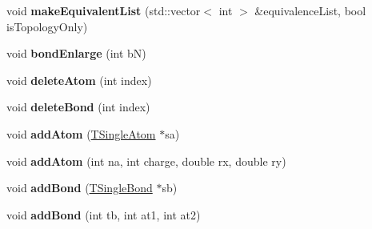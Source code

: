 \begin{DoxyCompactItemize}
\item 
\hypertarget{class_open_babel_1_1_t_simple_molecule_a13f944d57ee4340a444072091af5b9ff}{void {\bfseries make\-Equivalent\-List} (std\-::vector$<$ int $>$ \&equivalence\-List, bool is\-Topology\-Only)}\label{class_open_babel_1_1_t_simple_molecule_a13f944d57ee4340a444072091af5b9ff}

\item 
\hypertarget{class_open_babel_1_1_t_simple_molecule_ae52902f0fb246016dab39e98637a2519}{void {\bfseries bond\-Enlarge} (int b\-N)}\label{class_open_babel_1_1_t_simple_molecule_ae52902f0fb246016dab39e98637a2519}

\item 
\hypertarget{class_open_babel_1_1_t_simple_molecule_a1e20ed25ddd1f3f098cfca53c9f77b03}{void {\bfseries delete\-Atom} (int index)}\label{class_open_babel_1_1_t_simple_molecule_a1e20ed25ddd1f3f098cfca53c9f77b03}

\item 
\hypertarget{class_open_babel_1_1_t_simple_molecule_ad91e0e536a0095cc7a42fa2c6d3336cf}{void {\bfseries delete\-Bond} (int index)}\label{class_open_babel_1_1_t_simple_molecule_ad91e0e536a0095cc7a42fa2c6d3336cf}

\item 
\hypertarget{class_open_babel_1_1_t_simple_molecule_ace162565d9e5b2c7e01aab87c5224742}{void {\bfseries add\-Atom} (\hyperlink{class_open_babel_1_1_t_single_atom}{T\-Single\-Atom} $\ast$sa)}\label{class_open_babel_1_1_t_simple_molecule_ace162565d9e5b2c7e01aab87c5224742}

\item 
\hypertarget{class_open_babel_1_1_t_simple_molecule_abf7c0a575faa098e0c53b4e0036158cf}{void {\bfseries add\-Atom} (int na, int charge, double rx, double ry)}\label{class_open_babel_1_1_t_simple_molecule_abf7c0a575faa098e0c53b4e0036158cf}

\item 
\hypertarget{class_open_babel_1_1_t_simple_molecule_af37c862377af5f5cb79fe9dc927b40e7}{void {\bfseries add\-Bond} (\hyperlink{class_open_babel_1_1_t_single_bond}{T\-Single\-Bond} $\ast$sb)}\label{class_open_babel_1_1_t_simple_molecule_af37c862377af5f5cb79fe9dc927b40e7}

\item 
\hypertarget{class_open_babel_1_1_t_simple_molecule_a381baebac4c1f467a7236e5aeaea0c7e}{void {\bfseries add\-Bond} (int tb, int at1, int at2)}\label{class_open_babel_1_1_t_simple_molecule_a381baebac4c1f467a7236e5aeaea0c7e}


\end{DoxyCompactItemize}
